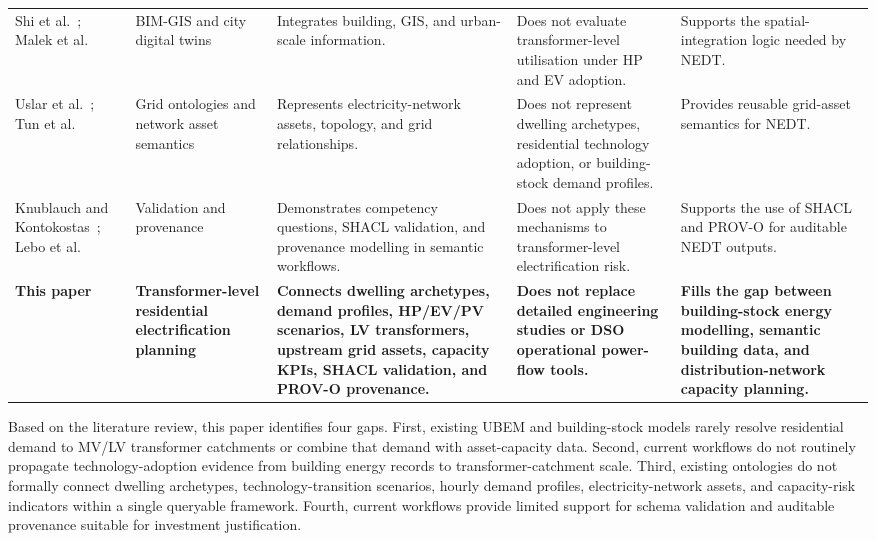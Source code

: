 \documentclass[preprint,12pt]{elsarticle}
\begin{document}
\begin{table}[H]
\begin{tabularx}{\textwidth}{P{2.8cm}P{2.8cm}P{3.2cm}P{3.2cm}P{3.2cm}}
Shi et al.~\cite{shi_ontology-based_2023};
Malek et al.~\cite{malek_bridging_2026} &
BIM-GIS and city digital twins &
Integrates building, GIS, and urban-scale information. &
Does not evaluate transformer-level utilisation under HP and EV adoption. &
Supports the spatial-integration logic needed by NEDT. \\

Uslar et al.~\cite{uslar_common_2012};
Tun et al.~\cite{tun_sargon2_2025} &
Grid ontologies and network asset semantics &
Represents electricity-network assets, topology, and grid relationships. &
Does not represent dwelling archetypes, residential technology adoption, or
building-stock demand profiles. &
Provides reusable grid-asset semantics for NEDT. \\

Knublauch and Kontokostas~\cite{knublauch_shacl_2017};
Lebo et al.~\cite{lebo_prov-o_2013} &
Validation and provenance &
Demonstrates competency questions, SHACL validation, and provenance
modelling in semantic workflows. &
Does not apply these mechanisms to transformer-level electrification risk. &
Supports the use of SHACL and PROV-O for auditable NEDT outputs. \\

\textbf{This paper} &
\textbf{Transformer-level residential electrification planning} &
\textbf{Connects dwelling archetypes, demand profiles, HP/EV/PV scenarios,
LV transformers, upstream grid assets, capacity KPIs, SHACL validation, and
PROV-O provenance.} &
\textbf{Does not replace detailed engineering studies or DSO operational
power-flow tools.} &
\textbf{Fills the gap between building-stock energy modelling, semantic
building data, and distribution-network capacity planning.} \\

\bottomrule
\end{tabularx}
\end{table}


Based on the literature review, this paper identifies four gaps.
First, existing UBEM and building-stock models rarely resolve residential
demand to MV/LV transformer catchments or combine that demand with
asset-capacity data.
Second, current workflows do not routinely propagate technology-adoption
evidence from building energy records to transformer-catchment scale.
Third, existing ontologies do not formally connect dwelling archetypes,
technology-transition scenarios, hourly demand profiles, electricity-network
assets, and capacity-risk indicators within a single queryable framework.
Fourth, current workflows provide limited support for schema validation and
auditable provenance suitable for investment justification.
\end{document}
